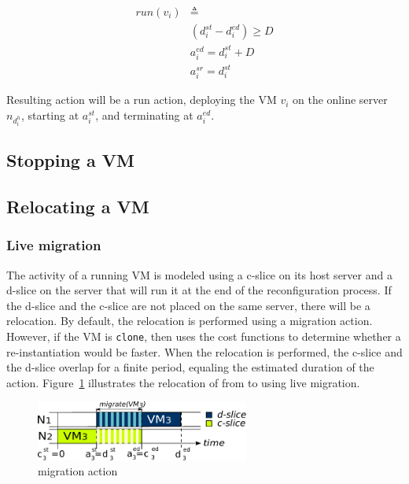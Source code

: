 \begin{equation*}
\begin{split}
run(v_i) & \triangleq \\
& (d_i^{st} - d_i^{ed}) \geq D \\
& a_i^{ed} = d_i^{st} + D \\
& a_i^{sr} = d_i^{st}
\end{split}
\end{equation*}

Resulting action will be a run action, deploying the VM $v_i$ on the online server $n_{d_i^h}$, starting at $a_i^{st}$, and terminating at $a_i^{ed}$.

\subsection{Stopping a VM}

\subsection{Relocating a VM}

\subsubsection{Live migration}

The activity of a running
VM is modeled using a c-slice on its host server and a
d-slice on the server that will run it at the end of the reconfiguration
process. If the d-slice and the c-slice are not placed on the same server,
there will be a relocation. 
%
By default, the relocation is performed using
a migration action. However, if the VM is \texttt{clone}, then {\btrp} uses
the cost functions to determine whether a re-instantiation would be faster.
When the relocation is performed, the c-slice and the d-slice overlap for a
finite period, equaling the estimated duration of the action.
Figure~\ref{fig: migration model} illustrates the relocation of  from  to 
using live migration.

\begin{figure}[htb]
\centering
\includegraphics[width=7cm]{img/migration_model}
\caption{migration action}\label{fig: migration model}
\end{figure}

